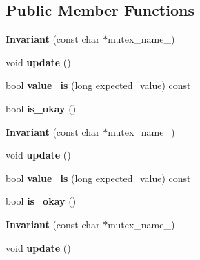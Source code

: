 \subsection*{Public Member Functions}
\begin{DoxyCompactItemize}
\item 
\hypertarget{structInvariant_adf28c8c1fb7f3a09a93163ad8e2f1a00}{}{\bfseries Invariant} (const char $\ast$mutex\+\_\+name\+\_\+)\label{structInvariant_adf28c8c1fb7f3a09a93163ad8e2f1a00}

\item 
\hypertarget{structInvariant_a3e1e35c1cf6f672b2d0f55cd26566782}{}void {\bfseries update} ()\label{structInvariant_a3e1e35c1cf6f672b2d0f55cd26566782}

\item 
\hypertarget{structInvariant_ae2ff0dffa434ea064745c0c63b5124d0}{}bool {\bfseries value\+\_\+is} (long expected\+\_\+value) const \label{structInvariant_ae2ff0dffa434ea064745c0c63b5124d0}

\item 
\hypertarget{structInvariant_a01751e8dcc37c47646d2e63000e9b8df}{}bool {\bfseries is\+\_\+okay} ()\label{structInvariant_a01751e8dcc37c47646d2e63000e9b8df}

\item 
\hypertarget{structInvariant_adf28c8c1fb7f3a09a93163ad8e2f1a00}{}{\bfseries Invariant} (const char $\ast$mutex\+\_\+name\+\_\+)\label{structInvariant_adf28c8c1fb7f3a09a93163ad8e2f1a00}

\item 
\hypertarget{structInvariant_a3e1e35c1cf6f672b2d0f55cd26566782}{}void {\bfseries update} ()\label{structInvariant_a3e1e35c1cf6f672b2d0f55cd26566782}

\item 
\hypertarget{structInvariant_ae2ff0dffa434ea064745c0c63b5124d0}{}bool {\bfseries value\+\_\+is} (long expected\+\_\+value) const \label{structInvariant_ae2ff0dffa434ea064745c0c63b5124d0}

\item 
\hypertarget{structInvariant_a01751e8dcc37c47646d2e63000e9b8df}{}bool {\bfseries is\+\_\+okay} ()\label{structInvariant_a01751e8dcc37c47646d2e63000e9b8df}

\item 
\hypertarget{structInvariant_adf28c8c1fb7f3a09a93163ad8e2f1a00}{}{\bfseries Invariant} (const char $\ast$mutex\+\_\+name\+\_\+)\label{structInvariant_adf28c8c1fb7f3a09a93163ad8e2f1a00}

\item 
\hypertarget{structInvariant_a3e1e35c1cf6f672b2d0f55cd26566782}{}void {\bfseries update} ()\label{structInvariant_a3e1e35c1cf6f672b2d0f55cd26566782}


\end{DoxyCompactItemize}
